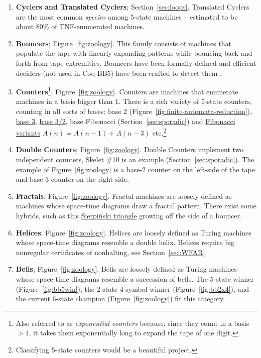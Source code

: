 \documentclass[a4paper,british]{article}
\theoremstyle{definition} %
\numberwithin{equation}{section}
\theoremstyle{definition} %
\newcommand{\CoqBB}{Coq-BB5\xspace}
\begin{document}
\begin{enumerate}
    \item \textbf{Cyclers and Translated Cyclers}; Section~\ref{sec:loops}. Translated Cyclers are the most common \textit{species} among 5-state machines -- estimated to be about 80\% of TNF-enumerated machines.
    \item \textbf{Bouncers}; Figure~\ref{fig:zoology}. This family consists of machines that populate the tape with linearly-expanding patterns while bouncing back and forth from tape extremities. Bouncers have been formally defined and efficient deciders (not used in \CoqBB) have been crafted to detect them \cite{bbchallenge_part1}.
    \item \textbf{Counters}\footnote{Also referred to as \textit{exponential counters} because, since they count in a basis $> 1$, it takes them exponentially long to expand the tape of one digit.}; Figure~\ref{fig:zoology}. Counters are machines that enumerate machines in a basis bigger than $1$. There is a rich variety of 5-state counters, counting in all sorts of bases: base 2 (Figure~\ref{fig:finite-automata-reduction}), \href{https://bbchallenge.org/1RB1RB_1RC0LD_1LD1RA_---1LE_0RA0LE }{base 3}, \href{https://bbchallenge.org/1LB1RC_0LE0RA_1LD1RA_0RA1LB_0RD0LB}{base 3/2}, base Fibonacci (Section~\ref{sec:sporadic}) and \href{https://bbchallenge.org/1RB1RA_0LC1LC_0RD1LD_0RA0LB}{Fibonacci variants} $A(n) = A(n-1) + A(n-3)$ etc.\footnote{Classifying 5-state counters would be a beautiful project.}
    \item \textbf{Double Counters}; Figure~\ref{fig:zoology}. Double Counters implement two independent counters, Skelet \#10 is an example (Section~\ref{sec:sporadic}). The example of Figure~\ref{fig:zoology} is a base-2 counter on the left-side of the tape and base-3 counter on the right-side.
    \item \textbf{Fractals}; Figure~\ref{fig:zoology}. Fractal machines are loosely defined as machines whose space-time diagrams draw a fractal pattern. There exist some hybrids, such as this \href{https://bbchallenge.org/1RB1RC_1RC1RB_1LD0RA_---1LE_0LD0LA&s=20000}{Sierpiński triangle} growing off the side of a bouncer.
    \item \textbf{Helices}; Figure~\ref{fig:zoology}. Helices are loosely defined as Turing machines whose space-time diagrams resemble a double helix. Helices require big nonregular certificates of nonhalting, see Section~\ref{sec:WFAR}.
    \item \textbf{Bells}; Figure~\ref{fig:zoology}. Bells are loosely defined as Turing machines whose space-time diagrams resemble a succession of bells. The 5-state winner (Figure~\ref{fig:bb5win}), the 2-state 4-symbol winner (Figure~\ref{fig:bb2x4}), and the current 6-state champion (Figure~\ref{fig:zoology}) fit this category.
\end{enumerate}
\end{document}
